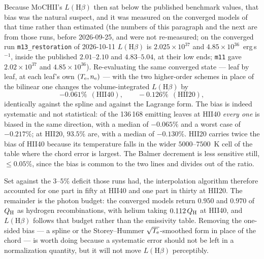 \documentclass[english,a4paper]{my_memo}
\newcommand{\code}[1]{\texttt{#1}}
\newcommand{\MoCHII}{\textsc{MoCHII}}
\newcommand{\Te}{T_{\rm e}}
\newcommand{\nelec}{n_{\rm e}}
\newcommand{\QH}{Q_{\rm H}}
\begin{document}
Because \MoCHII{}'s $L(\mathrm{H}\beta)$ then sat below the published
benchmark values, that bias was the natural suspect, and it was measured on the
converged models of that time rather than estimated (the numbers of this
paragraph and the next are from those runs, before 2026-09-25, and were not
re-measured; on the converged run \code{m13\_restoration} of 2026-10-11
$L(\mathrm{H}\beta)$ is $2.025\times10^{37}$ and
$4.85\times10^{36}$~erg\,s$^{-1}$, inside the published $2.01$--$2.10$ and
$4.83$--$5.04$, at their low ends; \code{m11} gave $2.02\times10^{37}$ and
$4.85\times10^{36}$).  Re-evaluating the same converged state
--- leaf by leaf, at each leaf's own $(\Te,\nelec)$ --- with the two
higher-order schemes in place of the bilinear one changes the
volume-integrated $L(\mathrm{H}\beta)$ by
\begin{equation}
  -0.061\%\ \ (\mathrm{HII40}), \qquad -0.126\%\ \ (\mathrm{HII20}),
  \label{eq:interpbias}
\end{equation}
identically against the spline and against the Lagrange form.  The bias is
indeed systematic and not statistical: of the 136\,168 emitting leaves at
HII40 \emph{every one} is biased in the same direction, with a median of
$-0.065\%$ and a worst case of $-0.217\%$; at HII20, $93.5\%$ are, with a
median of $-0.130\%$.  HII20 carries twice the bias of HII40 because its
temperature falls in the wider $5000$--$7500$~K cell of the table where the
chord error is largest.  The Balmer decrement is less sensitive still,
$\le 0.05\%$, since the bias is common to the two lines and divides out of the
ratio.

Set against the $3$--$5\%$ deficit those runs had, the
interpolation algorithm therefore accounted for one part in fifty at HII40 and
one part in thirty at HII20.  The remainder is the photon budget: the
converged models return $0.950$ and $0.970$ of $\QH$ as hydrogen
recombinations, with helium taking $0.112\,\QH$ at HII40, and
$L(\mathrm{H}\beta)$ follows that budget rather than the emissivity table.
Removing the one-sided bias --- a spline or the Storey--Hummer
$\sqrt{\Te}$-smoothed form in place of the chord --- is worth doing because a
systematic error should not be left in a normalization quantity, but it will
not move $L(\mathrm{H}\beta)$ perceptibly.
\end{document}
